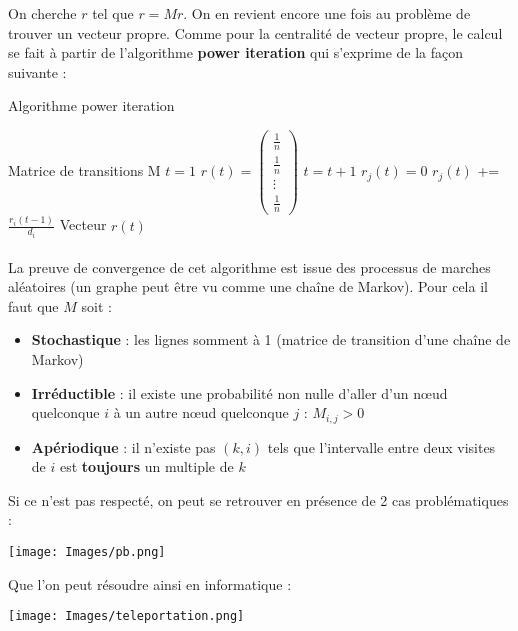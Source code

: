 \documentclass[14pt, openany]{article}
\begin{document}
On cherche $r$ tel que $r = Mr$. On en revient encore une fois au problème de trouver un vecteur propre. Comme pour la centralité de vecteur propre, le calcul se fait à partir de l'algorithme \textbf{power iteration} qui s'exprime de la façon suivante :
\begin{algorithm}
\caption{Algorithme power iteration}
\begin{algorithmic}
\REQUIRE 
\STATE Matrice de transitions M
\STATE $t=1$
\STATE $r(t)=
\begin{pmatrix}
\frac{1}{n} \\
\frac{1}{n}\\
\vdots \\
\frac{1}{n}
\end{pmatrix}$
\STATE $t = t+1$
\STATE $r_j(t)=0$
\STATE $r_j(t)$ += $\frac{r_i(t-1)}{d_i}$
\ENDFOR
\ENDFOR
\ENDWHILE
\RETURN Vecteur $r(t)$
\end{algorithmic}
\end{algorithm}
\paragraph{}
La preuve de convergence de cet algorithme est issue des processus de marches aléatoires (un graphe peut être vu comme une chaîne de Markov). Pour cela il faut que $M$ soit :
\begin{itemize}
\item \textbf{Stochastique} : les lignes somment à 1 (matrice de transition d'une chaîne de Markov)
\item \textbf{Irréductible} : il existe une probabilité non nulle d'aller d'un nœud quelconque $i$ à un autre nœud quelconque $j$ : $M_{i,j} > 0$
\item \textbf{Apériodique} : il n'existe pas $(k, i)$ tels que l'intervalle entre deux visites de $i$ est \textbf{toujours} un multiple de $k$
\end{itemize}
Si ce n'est pas respecté, on peut se retrouver en présence de 2 cas problématiques :
\begin{center}
\texttt{[image: Images/pb.png]}
\label{fig1}
\end{center}
Que l'on peut résoudre ainsi en informatique :
\begin{center}
\texttt{[image: Images/teleportation.png]}
\label{fig1}
\end{center}
\end{document}
